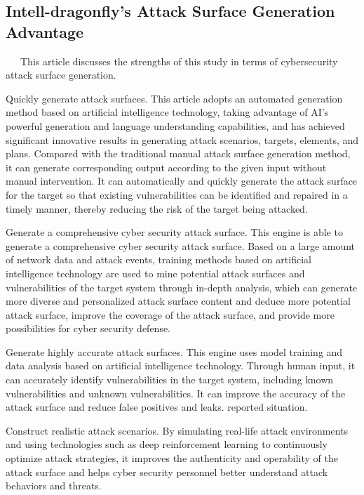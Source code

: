 \documentclass[runningheads]{llncs}
\begin{document}
\subsection{Intell-dragonfly's Attack Surface Generation Advantage}
\ \ \ This article discusses the strengths of this study in terms of cybersecurity attack surface generation.\par
%
Quickly generate attack surfaces. This article adopts an automated generation method based on artificial intelligence technology, taking advantage of AI's powerful generation and language understanding capabilities, and has achieved significant innovative results in generating attack scenarios, targets, elements, and plans. Compared with the traditional manual attack surface generation method, it can generate corresponding output according to the given input without manual intervention. It can automatically and quickly generate the attack surface for the target so that existing vulnerabilities can be identified and repaired in a timely manner, thereby reducing the risk of the target being attacked.\par
%
Generate a comprehensive cyber security attack surface. This engine is able to generate a comprehensive cyber security attack surface. Based on a large amount of network data and attack events, training methods based on artificial intelligence technology are used to mine potential attack surfaces and vulnerabilities of the target system through in-depth analysis, which can generate more diverse and personalized attack surface content and deduce more potential attack surface, improve the coverage of the attack surface, and provide more possibilities for cyber security defense.\par
%
Generate highly accurate attack surfaces. This engine uses model training and data analysis based on artificial intelligence technology. Through human input, it can accurately identify vulnerabilities in the target system, including known vulnerabilities and unknown vulnerabilities. It can improve the accuracy of the attack surface and reduce false positives and leaks. reported situation.\par
%
Construct realistic attack scenarios. By simulating real-life attack environments and using technologies such as deep reinforcement learning to continuously optimize attack strategies, it improves the authenticity and operability of the attack surface and helps cyber security personnel better understand attack behaviors and threats.
%
\end{document}
